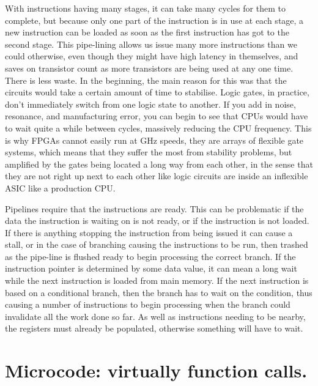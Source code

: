 With instructions having many stages, it can take many cycles for them to
complete, but because only one part of the instruction is in use at each stage,
a new instruction can be loaded as soon as the first instruction has got to the
second stage. This pipe-lining allows us issue many more instructions than we
could otherwise, even though they might have high latency in themselves, and
saves on transistor count as more transistors are being used at any one time.
There is less waste. In the beginning, the main reason for this was that the
circuits would take a certain amount of time to stabilise. Logic gates, in
practice, don't immediately switch from one logic state to another. If you add
in noise, resonance, and manufacturing error, you can begin to see that CPUs
would have to wait quite a while between cycles, massively reducing the CPU
frequency. This is why FPGAs cannot easily run at GHz speeds, they are arrays
of flexible gate systems, which means that they suffer the most from stability
problems, but amplified by the gates being located a long way from each other,
in the sense that they are not right up next to each other like logic circuits
are inside an inflexible ASIC like a production CPU.

Pipelines require that the instructions are ready. This can be problematic if
the data the instruction is waiting on is not ready, or if the instruction is
not loaded. If there is anything stopping the instruction from being issued it
can cause a stall, or in the case of branching causing the instructions to be
run, then trashed as the pipe-line is flushed ready to begin processing the
correct branch. If the instruction pointer is determined by some data value, it
can mean a long wait while the next instruction is loaded from main memory. If
the next instruction is based on a conditional branch, then the branch has to
wait on the condition, thus causing a number of instructions to begin
processing when the branch could invalidate all the work done so far. As well
as instructions needing to be nearby, the registers must already be populated,
otherwise something will have to wait.

\section[Microcode]{Microcode: virtually function calls.}

